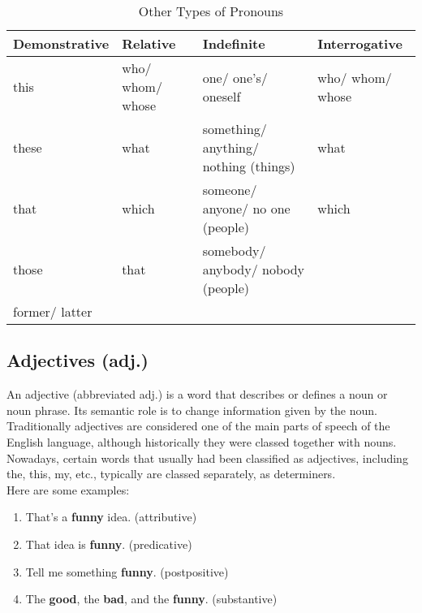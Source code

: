 \begin{longtable}{|p{2.5cm}|p{2.5cm}|p{2.5cm}|p{2.5cm}|}
    \caption{Other Types of Pronouns}
    \\ \hline

    \textbf{Demonstrative} & \textbf{Relative} & \textbf{Indefinite} & \textbf{Interrogative}\\
    \hline
    \endfirsthead
    \hline \endhead
    \hline \endlastfoot
    \hline \endfoot

    this & who/ whom/ whose & one/ one's/ oneself & who/ whom/ whose \\ \hline
    these & what & something/ anything/ nothing (things) & what \\ \hline
    that & which & someone/ anyone/ no one (people) & which \\ \hline
    those & that & somebody/ anybody/ nobody (people) & \\ \hline
    former/ latter & & & \\ \hline

\end{longtable}



\subsection{Adjectives (adj.) \cite{wiki-adjective,wiki-eng-adjective}}

An adjective (abbreviated adj.) is a word that describes or defines a noun or noun phrase. Its semantic role is to change information given by the noun.\\

Traditionally adjectives are considered one of the main parts of speech of the English language, although historically they were classed together with nouns. Nowadays, certain words that usually had been classified as adjectives, including the, this, my, etc., typically are classed separately, as determiners. \\

Here are some examples:
\begin{enumerate}
    \item That's a \textbf{funny} idea. (attributive)
    \item That idea is \textbf{funny}. (predicative)
    \item Tell me something \textbf{funny}. (postpositive)
    \item The \textbf{good}, the \textbf{bad}, and the \textbf{funny}. (substantive)
\end{enumerate}


